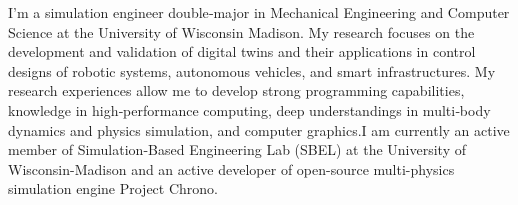 

\begin{cvparagraph}

I’m a simulation engineer double‑major in Mechanical Engineering and Computer Science at the University of Wisconsin Madison. My research focuses on the development and validation of digital twins and their applications in control designs of robotic systems, autonomous vehicles, and smart infrastructures. My research experiences allow me to develop strong programming capabilities, knowledge in high‑performance computing, deep understandings in multi‑body dynamics and physics simulation, and computer graphics.I am currently an active member of Simulation-Based Engineering Lab (SBEL) at the University of Wisconsin-Madison and an active developer of open-source multi-physics simulation engine Project Chrono.\\


\end{cvparagraph}